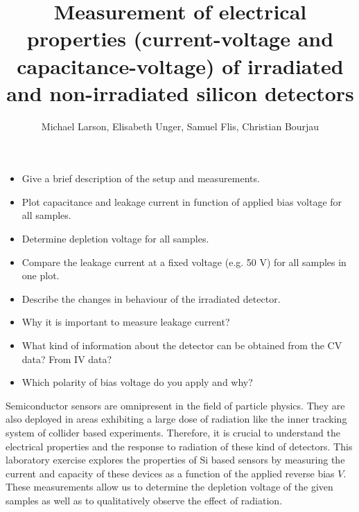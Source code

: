 \documentclass[11pt]{article}
\title{Measurement of electrical properties (current-voltage and capacitance-voltage) of irradiated and non-irradiated silicon detectors}
\author{Michael Larson, Elisabeth Unger, Samuel Flis, Christian Bourjau}
\begin{document}
\maketitle
\begin{itemize}
\item Give a brief description of the setup and measurements.
\item Plot capacitance and leakage current in function of applied bias voltage for all samples.
\item Determine depletion voltage for all samples.
\item Compare the leakage current at a fixed voltage (e.g. 50 V) for all samples in one plot.
\item Describe the changes in behaviour of the irradiated detector.
\item Why it is important to measure leakage current?
\item What kind of information about the detector can be obtained from the CV data? From IV data?
\item Which polarity of bias voltage do you apply and why?
\end{itemize}

Semiconductor sensors are omnipresent in the field of particle physics. They are also deployed in areas exhibiting a large dose of radiation like the inner tracking system of collider based experiments. Therefore, it is crucial to understand the electrical properties and the response to radiation of these kind of detectors. This laboratory exercise explores the  properties of Si based sensors by measuring the current and capacity of these devices as a function of the applied reverse bias $V$. These measurements allow us to determine the depletion voltage of the given samples as well as to qualitatively observe the effect of radiation.
\end{document}
